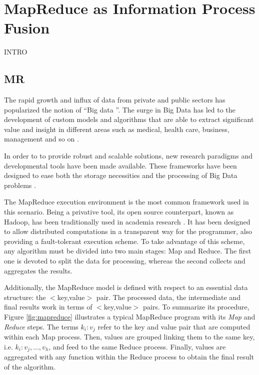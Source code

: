 \documentclass[3p,review]{elsarticle}
\begin{document}
\section{MapReduce as Information Process Fusion}\label{sec:mr}




INTRO

\subsection{MR}\label{subsec:mr}

The rapid growth and influx of data from private and public sectors has popularized the notion of ``Big data \cite{Fer14}''. The surge in Big Data has led to the development of custom models and algorithms that are able to extract significant value and insight in different areas such as medical, health care, business, management and so on \cite{Kam14,Chen14,Wu14}.

In order to to provide robust and scalable solutions, new research paradigms and developmental tools have been made available. These frameworks have been designed to ease both the storage necessities and the processing of Big Data problems \cite{Fer14}. 

The MapReduce execution environment \cite{Dea08} is the most common framework used in this scenario. Being a privative tool, its open source counterpart, known as Hadoop, has been traditionally used in academia research \cite{Whi15-Hadoop}. It has been designed to allow distributed computations in a transparent way for the programmer, also providing a fault-tolerant execution scheme. To take advantage of this scheme, any algorithm must be divided into two main stages: Map and Reduce. The first one is devoted to split the data for processing, whereas the second collects and aggregates the results.

Additionally, the MapReduce model is defined with respect to an essential data structure: the $<$key,value$>$ pair. The processed data, the intermediate and final results work in terms of $<$key,value$>$ pairs. To summarize its procedure, Figure \ref{fig:mapreduce} illustrates a typical MapReduce program with its \textit{Map} and \textit{Reduce} steps. The terms $k_i:v_j$ refer to the key and value pair that are computed within each Map process. Then, values are grouped linking them to the same key, i.e. $k_i:v_j,\ldots, v_h$, and feed to the same Reduce process. Finally, values are aggregated with any function within the Reduce process to obtain the final result of the algorithm.
\end{document}
